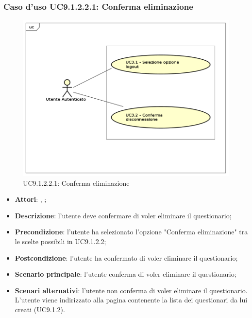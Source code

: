 				\subsubsection{Caso d'uso UC9.1.2.2.1: Conferma eliminazione}
				\label{UC9.1.2.2.1}
				\begin{figure}[h]
					\centering
				\includegraphics[scale=0.5,keepaspectratio]{UML/UC9.png}
					\caption{UC9.1.2.2.1: Conferma eliminazione}
				\end{figure}
				\FloatBarrier
				\begin{itemize}
					\item \textbf{Attori}: \uau, \uaupro;
					\item \textbf{Descrizione}: l'utente deve confermare di voler eliminare il questionario; 
					\item \textbf{Precondizione}: l'utente ha selezionato l'opzione "Conferma eliminazione" tra le scelte possibili in UC9.1.2.2;
					\item \textbf{Postcondizione}: l'utente ha confermato di voler eliminare il questionario;
					\item \textbf{Scenario principale}: l'utente conferma di voler eliminare il questionario;
					\item \textbf{Scenari alternativi}: l'utente non conferma di voler eliminare il questionario. L'utente viene indirizzato alla pagina contenente la lista dei questionari da lui creati (UC9.1.2).
				\end{itemize}
								
